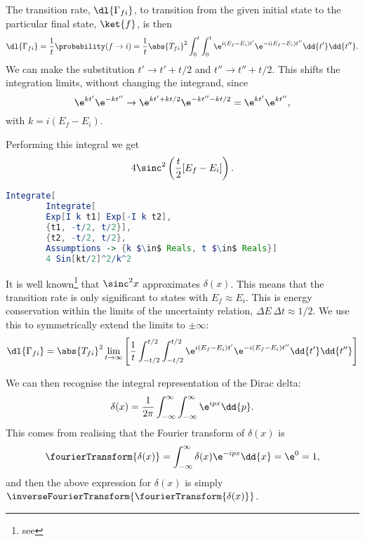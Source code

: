 The transition rate, \(\dl{\Gamma_{fi}}\), to transition from the given initial state to the particular final state, \(\ket{f}\), is then
\begin{equation}
    \dl{\Gamma_{fi}} = \frac{1}{t} \probability(f \to i) = \frac{1}{t} \abs{T_{fi}}^2 \int_0^t \int_0^t \e^{i(E_f - E_i)t'} \e^{-i(E_f - E_i)t''} \dd{t'} \dd{t''}.
\end{equation}
We can make the substitution \(t' \to t' + t/2\) and \(t'' \to t'' + t/2\).
This shifts the integration limits, without changing the integrand, since
\begin{equation}
    \e^{kt'}\e^{-kt''} \to \e^{kt' + kt/2}\e^{-kt'' - kt/2} = \e^{kt'}\e^{kt''},
\end{equation}
with \(k = i(E_f - E_i)\).

Performing this integral we get
\begin{equation}
    4\sinc^2\left( \frac{t}{2}[E_f - E_i] \right).
\end{equation}
\begin{cde}{}{}
    \begin{lstlisting}[gobble=8, language=mathematica, mathescape]
        Integrate[
        Integrate[
        Exp[I k t1] Exp[-I k t2],
        {t1, -t/2, t/2}],
        {t2, -t/2, t/2},
        Assumptions -> {k $\in$ Reals, t $\in$ Reals}]
        4 Sin[kt/2]^2/k^2
    \end{lstlisting}
\end{cde}
It is well known\footnote{see } that \(\sinc^2 x\) approximates \(\delta(x)\).
This means that the transition rate is only significant to states with \(E_f \approx E_i\).
This is energy conservation within the limits of the uncertainty relation, \(\Delta E \, \Delta t \approx 1/2\).
We use this to symmetrically extend the limits to \(\pm \infty\):
\begin{equation}
    \dl{\Gamma_{fi}} = \abs{T_{fi}}^2 \lim_{t \to \infty} \left[ \frac{1}{t} \int_{-t/2}^{t/2} \int_{-t/2}^{t/2} \e^{i(E_f - E_i)t'} \e^{-i(E_f - E_i)t''} \dd{t'} \dd{t''} \right]
\end{equation}

We can then recognise the integral representation of the Dirac delta:
\begin{equation}
    \delta(x) = \frac{1}{2\pi} \int_{-\infty}^{\infty} \int_{-\infty}^{\infty} \e^{ipx} \dd{p}.
\end{equation}
This comes from realising that the Fourier transform of \(\delta(x)\) is
\begin{equation}
    \fourierTransform \{\delta(x)\} = \int_{-\infty}^{\infty} \delta(x) \e^{-ipx} \dd{x} = \e^{0} = 1,
\end{equation}
and then the above expression for \(\delta(x)\) is simply \(\inverseFourierTransform\{\fourierTransform\{\delta(x)\}\}\).


